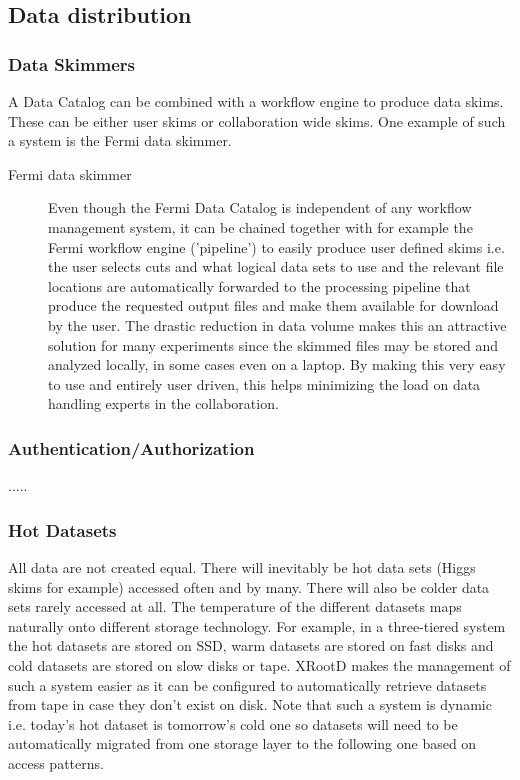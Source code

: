 \subsection{Data distribution}

\subsubsection{Data Skimmers}
A Data Catalog can be combined with a workflow engine to produce data skims. These can be either user skims or collaboration 
wide skims. One example of such a system is the Fermi data skimmer.

\begin{description}
\item[Fermi data skimmer] Even though the Fermi Data Catalog is independent of any workflow management system, it 
can be chained together with for example the Fermi workflow engine ('pipeline') to easily produce user defined skims 
i.e. the user selects cuts and what logical data sets to use and the relevant file locations are automatically 
forwarded to the processing pipeline that produce the requested output files and make them available for download 
by the user. The drastic reduction in data volume makes this an attractive solution for many experiments since the skimmed files 
may be stored and analyzed locally, in some cases even on a laptop. By making this very easy to use and entirely user driven, this 
helps minimizing the load on data handling experts in the collaboration.    
\end{description}

\subsubsection{Authentication/Authorization} 
.....


\subsubsection{Hot Datasets}
All data are not created equal. There will inevitably be hot data sets (Higgs skims for example) accessed often and by 
many. There will also be colder data sets rarely accessed at all. The temperature of the different datasets maps  
naturally onto different storage technology. For example, in a three-tiered system the hot datasets are stored on SSD, 
warm datasets are stored on fast disks and cold datasets are stored on slow disks or tape. XRootD makes the 
management of such a system easier as it can be configured to automatically retrieve datasets from tape in case they 
don't exist on disk. Note that such a system is dynamic i.e. today's hot dataset is tomorrow's cold one so datasets will 
need to be automatically migrated from one storage layer to the following one based on access patterns. 




